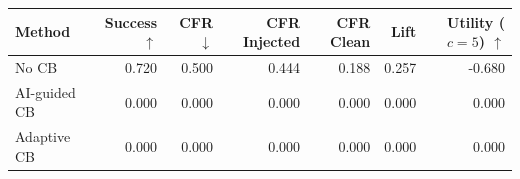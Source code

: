 \begin{tabular}{lrrrrrr}
\toprule
Method & Success $\uparrow$ & CFR $\downarrow$ & CFR Injected & CFR Clean & Lift & Utility ($c=5$) $\uparrow$ \\
\midrule
No CB & 0.720 & 0.500 & 0.444 & 0.188 & 0.257 & -0.680 \\
AI-guided CB & 0.000 & 0.000 & 0.000 & 0.000 & 0.000 & 0.000 \\
Adaptive CB & 0.000 & 0.000 & 0.000 & 0.000 & 0.000 & 0.000 \\
\bottomrule
\end{tabular}
